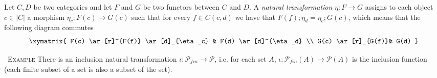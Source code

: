 \documentclass[10pt, a4paper]{isov2}
\renewenvironment{example}[0]{\ \newline \textsc{Example}\quad }{}
\newcommand\blankpage{%
      \null
      \thispagestyle{empty}%
      \addtocounter{page}{-1}%
      \newpage}
\begin{document}


\begin{definition}
Let $C, D$ be two categories and let $F$ and $G$ be two functors between $C$ and $D$.
A \emph{natural transformation} $\eta : F \to G$ assigns to each object $c\in |C|$ a
morphism $\eta_c : F(c) \to G(c) $ such that for every $f\in C(c,d)$ we have that 
$F(f);\eta_d = \eta_c;G(c)$, which means that the following diagram commutes
%
\begin{equation*}
\xymatrix{
  F(c) \ar[r]^{F(f)} \ar[d]_{\eta_c} & F(d) \ar[d]^{\eta_d} \\
  G(c) \ar[r]_{G(f)}& G(d) 
}
\end{equation*}
\end{definition}

\begin{example}
There is an inclusion natural transformation $\iota:\mathcal{P}_{\mathit{fin}}\to\mathcal{P}$,
i.e. for each set $A$, $\iota : \mathcal{P}_{\mathit{fin}}(A)\to\mathcal{P}(A)$ is the inclusion
function (each finite subset of a set is also a subset of the set).
\end{example}





%  
% 


%
%
\end{document}
